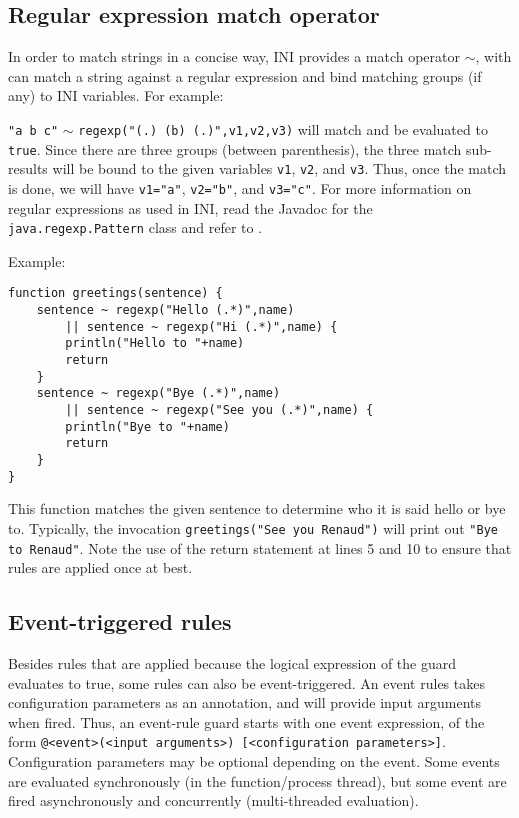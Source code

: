 \documentclass[11pt]{report}
\begin{document}
\subsection{Regular expression match operator\label{subsubsec:regexp}}

In order to match strings in a concise way, INI provides a match operator $\sim$, with can match a string against a regular expression \cite{friedl2006} and bind matching groups (if any) to INI variables. For example:

\texttt{"a b c"} $\sim$ \texttt{regexp("(.) (b) (.)",v1,v2,v3)} will match and be evaluated to \texttt{true}. Since there are three groups (between parenthesis), the three match sub-results will be bound to the given variables \texttt{v1}, \texttt{v2}, and \texttt{v3}. Thus, once the match is done, we will have \texttt{v1="a"}, \texttt{v2="b"}, and \texttt{v3="c"}. For more information on regular expressions as used in INI, read the Javadoc for the \texttt{java.regexp.Pattern} class and refer to \cite{friedl2006}.

Example:

\begin{lstlisting}
function greetings(sentence) {
	sentence ~ regexp("Hello (.*)",name)
		|| sentence ~ regexp("Hi (.*)",name) {
		println("Hello to "+name)
		return
	}
	sentence ~ regexp("Bye (.*)",name)
		|| sentence ~ regexp("See you (.*)",name) {
		println("Bye to "+name)
		return
	}
}
\end{lstlisting}

This function matches the given sentence to determine who it is said hello or bye to. Typically, the invocation \texttt{greetings("See you Renaud")} will print out \texttt{"Bye to Renaud"}. Note the use of the return statement at lines 5 and 10 to ensure that rules are applied once at best.

\subsection{Event-triggered rules}

Besides rules that are applied because the logical expression of the guard evaluates to true, some rules can also be event-triggered. An event rules takes configuration parameters as an annotation, and will provide input arguments when fired. Thus, an event-rule guard starts with one event expression, of the form \texttt{@<event>(<input arguments>) [<configuration parameters>]}. Configuration parameters may be optional depending on the event. Some events are evaluated synchronously (in the function/process thread), but some event are fired asynchronously and concurrently (multi-threaded evaluation).
\end{document}
